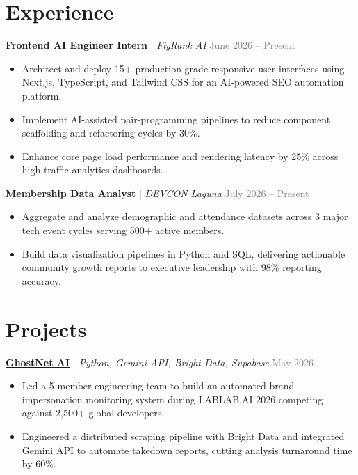 \documentclass[a4paper,10pt]{article}
\begin{document}
\section{Experience}

\textbf{Frontend AI Engineer Intern} $|$ \textit{FlyRank AI} \hfill \textcolor{gray}{June 2026 -- Present}
\begin{itemize}
    \item Architect and deploy 15+ production-grade responsive user interfaces using Next.js, TypeScript, and Tailwind CSS for an AI-powered SEO automation platform.
    \item Implement AI-assisted pair-programming pipelines to reduce component scaffolding and refactoring cycles by 30\%.
    \item Enhance core page load performance and rendering latency by 25\% across high-traffic analytics dashboards.
\end{itemize}

\textbf{Membership Data Analyst} $|$ \textit{DEVCON Laguna} \hfill \textcolor{gray}{July 2026 -- Present}
\begin{itemize}
    \item Aggregate and analyze demographic and attendance datasets across 3 major tech event cycles serving 500+ active members.
    \item Build data visualization pipelines in Python and SQL, delivering actionable community growth reports to executive leadership with 98\% reporting accuracy.
\end{itemize}

\section{Projects}

\textbf{\href{https://ghostnet-ai.vercel.app/}{GhostNet AI}} $|$ \textit{Python, Gemini API, Bright Data, Supabase} \hfill \textcolor{gray}{May 2026}
\begin{itemize}
    \item Led a 5-member engineering team to build an automated brand-impersonation monitoring system during LABLAB.AI 2026 competing against 2,500+ global developers.
    \item Engineered a distributed scraping pipeline with Bright Data and integrated Gemini API to automate takedown reports, cutting analysis turnaround time by 60\%.
\end{itemize}
\end{document}
